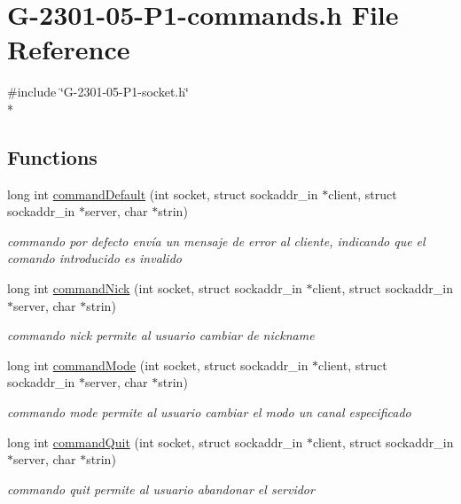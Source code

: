 \hypertarget{_g-2301-05-_p1-commands_8h}{\section{G-\/2301-\/05-\/\-P1-\/commands.h File Reference}
\label{_g-2301-05-_p1-commands_8h}
}
{\ttfamily \#include \char`\"{}G-\/2301-\/05-\/\-P1-\/socket.\-h\char`\"{}}\\*
\subsection*{Functions}
\begin{DoxyCompactItemize}
\item 
long int \hyperlink{_g-2301-05-_p1-commands_8h_af8fd36debbc6d010faa1515aa469f36e}{command\-Default} (int socket, struct sockaddr\-\_\-in $\ast$client, struct sockaddr\-\_\-in $\ast$server, char $\ast$strin)
\begin{DoxyCompactList}\small\item\em commando por defecto envía un mensaje de error al cliente, indicando que el comando introducido es invalido \end{DoxyCompactList}\item 
long int \hyperlink{_g-2301-05-_p1-commands_8h_a6c14bedc2ca0c1a7748fd188966f0699}{command\-Nick} (int socket, struct sockaddr\-\_\-in $\ast$client, struct sockaddr\-\_\-in $\ast$server, char $\ast$strin)
\begin{DoxyCompactList}\small\item\em commando nick permite al usuario cambiar de nickname \end{DoxyCompactList}\item 
long int \hyperlink{_g-2301-05-_p1-commands_8h_aaa0cd83abb127533a58a9824d766302d}{command\-Mode} (int socket, struct sockaddr\-\_\-in $\ast$client, struct sockaddr\-\_\-in $\ast$server, char $\ast$strin)
\begin{DoxyCompactList}\small\item\em commando mode permite al usuario cambiar el modo un canal especificado \end{DoxyCompactList}\item 
long int \hyperlink{_g-2301-05-_p1-commands_8h_a8c61e34c067a94ff808b75f1b5346685}{command\-Quit} (int socket, struct sockaddr\-\_\-in $\ast$client, struct sockaddr\-\_\-in $\ast$server, char $\ast$strin)
\begin{DoxyCompactList}\small\item\em commando quit permite al usuario abandonar el servidor \end{DoxyCompactList}\item 

\end{DoxyCompactItemize}
